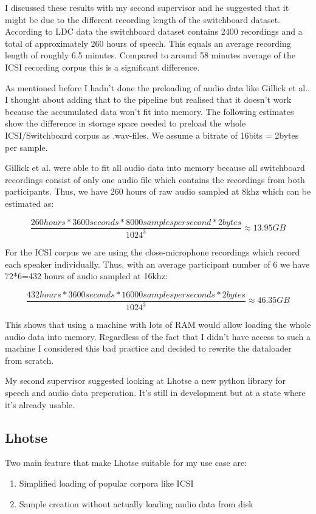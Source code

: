 \documentclass[bsc,frontabs,parskip,deptreport]{infthesis}
\begin{document}
I discussed these results with my second supervisor and he suggested that it might be due to the different recording length of the switchboard dataset. According to LDC data \cite{switchboard-ldc} the switchboard dataset contains 2400 recordings and a total of approximately 260 hours of speech. This equals an average recording length of roughly 6.5 minutes. Compared to around 58 minutes average \cite{icsi-ldc} of the ICSI recording corpus this is a significant difference.


As mentioned before I hadn't done the preloading of audio data like Gillick et al.. 
I thought about adding that to the pipeline but realised that it doesn't work because the accumulated data won't fit into memory. 
The following estimates show the difference in storage space needed to preload the whole ICSI/Switchboard corpus as .wav-files. We assume a bitrate of 16bits = 2bytes per sample.

Gillick et al. were able to fit all audio data into memory because all switchboard recordings consist of only one audio file which contains the recordings from both participants. Thus, we have 260 hours of raw audio sampled at 8khz which can be estimated as:

\[ \frac{260hours * 3600 seconds * 8000 samples per second * 2 bytes}{1024^3} \approx 13.95 GB \]

For the ICSI corpus we are using the close-microphone recordings which record each speaker individually. Thus, with an average participant number of 6 we have 72*6=432 hours of audio sampled at 16khz:

\[ \frac{432 hours * 3600 seconds * 16000 samples per seconds * 2bytes}{1024^3} \approx 46.35 GB \]

This shows that using a machine with lots of RAM would allow loading the whole audio data into memory. 
Regardless of the fact that I didn't have access to such a machine I considered this bad practice and decided to rewrite the dataloader from scratch. 

My second supervisor suggested looking at Lhotse \cite{zelasko2021lhotse} a new python library for speech and audio data preperation. It's still in development but at a state where it's already usable.

\subsection{Lhotse}
Two main feature that make Lhotse suitable for my use case are:
\begin{enumerate}
    \item Simplified loading of popular corpora like ICSI
    \item Sample creation without actually loading audio data from disk
\end{enumerate}
\end{document}
